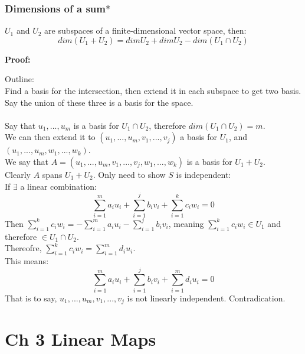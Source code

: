 \documentclass{article}
\begin{document}
\subsubsection{Dimensions of a sum$\ast$}
\begin{addmargin}[1em]{0em}
    $U_1$ and $U_2$ are subspaces of a finite-dimensional vector space, then:
    \begin{equation*}
        dim(U_1 + U_2) = dim U_2 + dim U_2 - dim(U_1 \cap U_2)
    \end{equation*}
\end{addmargin}
\textbf{Proof:}
\begin{addmargin}[1em]{0em}
    Outline:\\
    Find a basis for the intersection, then extend it in each subspace to get two basis. Say the union of these three is a basis for the space.\\\\
    Say that $u_1, ..., u_m$ is a basis for $U_1 \cap U_2$, therefore $dim(U_1 \cap U_2) = m$.\\
    We can then extend it to $(u_1, ..., u_m, v_1, ..., v_j)$ a basis for $U_1$, and $(u_1, ..., u_m, w_1, ..., w_k)$.\\
    We say that $A = (u_1, ..., u_m, v_1, ..., v_j, w_1, ..., w_k)$ is a basis for $U_1 + U_2$.\\
    Clearly $A$ spans $U_1 + U_2$. Only need to show $S$ is independent:\\
    If $\exists$ a linear combination:
    \begin{equation*}
        \sum_{i=1}^{m} a_i u_i + \sum_{i=1}^{j} b_iv_i + \sum_{i=1}^{k} c_iw_i = 0
    \end{equation*}
    Then $\sum_{i=1}^{k} c_iw_i = - \sum_{i=1}^{m} a_i u_i - \sum_{i=1}^{j} b_iv_i$, meaning $\sum_{i=1}^{k} c_iw_i \in U_1$ and therefore $\in U_1 \cap U_2$.\\
    Thereofre, $\sum_{i=1}^{k} c_iw_i = \sum_{i=1}^{m}d_iu_i$.\\
    This means:
    \begin{equation*}
        \sum_{i=1}^{m} a_i u_i + \sum_{i=1}^{j} b_iv_i + \sum_{i=1}^{m}d_iu_i = 0
    \end{equation*}
    That is to say, $u_1, ..., u_m, v_1, ..., v_j$ is not linearly independent. Contradication.\\
\end{addmargin}
\section{Ch 3 Linear Maps}
\end{document}
